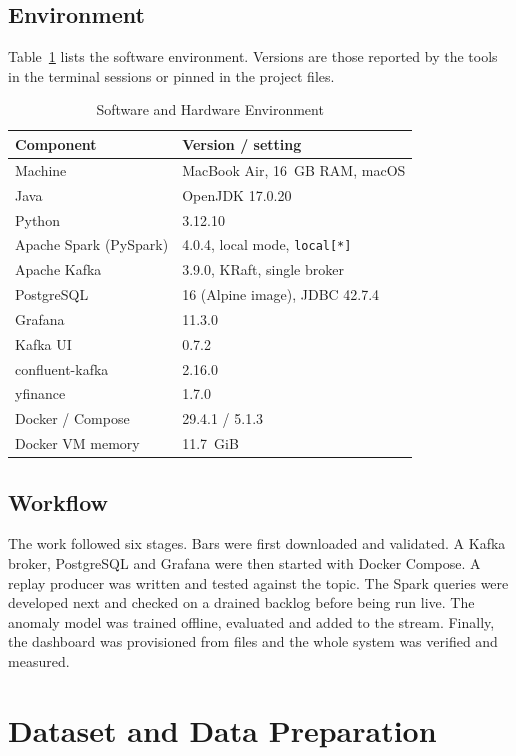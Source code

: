 \documentclass[conference]{IEEEtran}
\newcommand{\code}[1]{\texttt{#1}}
\begin{document}
\subsection{Environment}
Table~\ref{tab:env} lists the software environment. Versions are those reported by the tools in the terminal sessions or pinned in the project files.

\begin{table}[t]
\caption{Software and Hardware Environment}
\label{tab:env}
\centering
\small
\begin{tabular}{@{}p{3.3cm}p{4.9cm}@{}}
\toprule
Component & Version / setting \\
\midrule
Machine & MacBook Air, 16~GB RAM, macOS \\
Java & OpenJDK 17.0.20 \\
Python & 3.12.10 \\
Apache Spark (PySpark) & 4.0.4, local mode, \code{local[*]} \\
Apache Kafka & 3.9.0, KRaft, single broker \\
PostgreSQL & 16 (Alpine image), JDBC 42.7.4 \\
Grafana & 11.3.0 \\
Kafka UI & 0.7.2 \\
confluent-kafka & 2.16.0 \\
yfinance & 1.7.0 \\
Docker / Compose & 29.4.1 / 5.1.3 \\
Docker VM memory & 11.7~GiB \\
\bottomrule
\end{tabular}
\end{table}

\subsection{Workflow}
The work followed six stages. Bars were first downloaded and validated. A Kafka broker, PostgreSQL and Grafana were then started with Docker Compose. A replay producer was written and tested against the topic. The Spark queries were developed next and checked on a drained backlog before being run live. The anomaly model was trained offline, evaluated and added to the stream. Finally, the dashboard was provisioned from files and the whole system was verified and measured.

\section{Dataset and Data Preparation}
\end{document}
